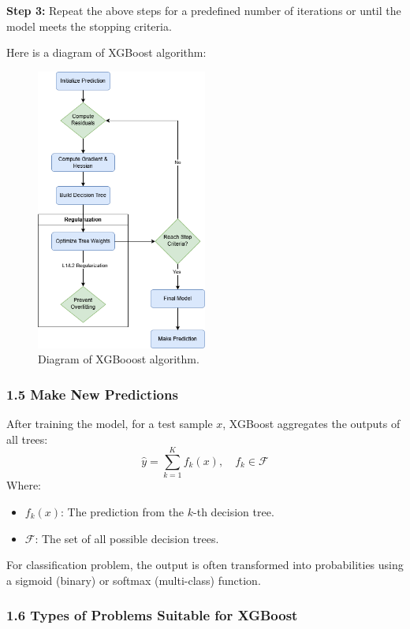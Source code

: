 \documentclass[
]{article}
\begin{document}
\textbf{Step 3:} Repeat the above steps for a predefined number of
iterations or until the model meets the stopping criteria.

Here is a diagram of XGBoost algorithm: \setcounter{figure}{0}

\begin{figure}
  \centering
  \includegraphics[width=0.5\textwidth]{XGBoost.png}
  \caption{Diagram of XGBooost algorithm.}
\end{figure}

\subsubsection{1.5 Make New Predictions}\label{make-new-predictions}

After training the model, for a test sample \(x\), XGBoost aggregates
the outputs of all trees: \[
\hat{y} = \sum_{k=1}^K f_k(x), \quad f_k \in \mathcal{F}
\] Where:

\begin{itemize}
\item
  \(f_k(x)\): The prediction from the \(k\)-th decision tree.
\item
  \(\mathcal{F}\): The set of all possible decision trees.
\end{itemize}

For classification problem, the output is often transformed into
probabilities using a sigmoid (binary) or softmax (multi-class)
function.

\subsubsection{1.6 Types of Problems Suitable for
XGBoost}\label{types-of-problems-suitable-for-xgboost}
\end{document}
